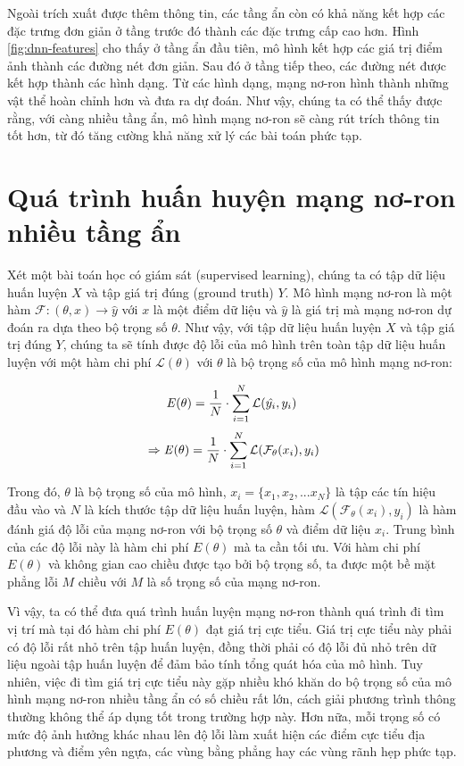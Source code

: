 Ngoài trích xuất được thêm thông tin, các tầng ẩn còn có khả năng kết hợp các đặc trưng đơn giản ở tầng trước đó thành các đặc trưng cấp cao hơn. Hình \ref{fig:dnn-features} cho thấy ở tầng ẩn đầu tiên, mô hình kết hợp các giá trị điểm ảnh thành các đường nét đơn giản. Sau đó ở tầng tiếp theo, các đường nét được kết hợp thành các hình dạng. Từ các hình dạng, mạng nơ-ron hình thành những vật thể hoàn chỉnh hơn và đưa ra dự đoán. Như vậy, chúng ta có thể thấy được rằng, với càng nhiều tầng ẩn, mô hình mạng nơ-ron sẽ càng rút trích thông tin tốt hơn, từ đó tăng cường khả năng xử lý các bài toán phức tạp.

\section{Quá trình huấn huyện mạng nơ-ron nhiều tầng ẩn}

Xét một bài toán học có giám sát (supervised learning), chúng ta có tập dữ liệu huấn luyện $X$ và tập giá trị đúng (ground truth) $Y$. Mô hình mạng nơ-ron là một hàm $\mathcal{F}: (\theta, x) \rightarrow \hat{y}$ với $x$ là một điểm dữ liệu và $\hat{y}$ là giá trị mà mạng nơ-ron dự đoán ra dựa theo bộ trọng số $\theta$. Như vậy, với tập dữ liệu huấn luyện $X$ và tập giá trị đúng $Y$, chúng ta sẽ tính được độ lỗi của mô hình trên toàn tập dữ liệu huấn luyện với một hàm chi phí $\mathcal{L}(\theta)$ với $\theta$ là bộ trọng số của mô hình mạng nơ-ron:

\begin{equation}
\label{eqn:E-y}
\mathbf{\it{E}(\theta)} = \frac{1}{N}\cdot \sum_{i=1}^{N}\mathcal{L}(\hat{y_i}, y_i)
\end{equation}
\begin{equation}
\label{eqn:E-Fx}
\\\Rightarrow \mathbf{\it{E}(\theta)} = \frac{1}{N}\cdot \sum_{i=1}^{N}\mathcal{L}(\mathcal{F}_\theta( x_i), y_i)
\end{equation}

Trong đó, $\theta$ là bộ trọng số của mô hình, $x_i = \{x_1, x_2,...x_N\}$ là tập các tín hiệu đầu vào và $N$ là kích thước tập dữ liệu huấn luyện, hàm $\mathcal{L}(\mathcal{F}_\theta( x_i), y_i)$ là hàm đánh giá độ lỗi của mạng nơ-ron với bộ trọng số $\theta$ và điểm dữ liệu $x_i$. Trung bình của các độ lỗi này là hàm chi phí $E(\theta)$ mà ta cần tối ưu. Với hàm chi phí $E(\theta)$ và không gian cao chiều được tạo bởi bộ trọng số, ta được một bề mặt phẳng lỗi $M$ chiều với $M$ là số trọng số của mạng nơ-ron.

Vì vậy, ta có thể đưa quá trình huấn luyện mạng nơ-ron thành quá trình đi tìm vị trí mà tại đó hàm chi phí $E(\theta)$ đạt giá trị cực tiểu. Giá trị cực tiểu này phải có độ lỗi rất nhỏ trên tập huấn luyện, đồng thời phải có độ lỗi đủ nhỏ trên dữ liệu ngoài tập huấn luyện để đảm bảo tính tổng quát hóa của mô hình. Tuy nhiên, việc đi tìm giá trị cực tiểu này gặp nhiều khó khăn do bộ trọng số của mô hình mạng nơ-ron nhiều tầng ẩn có số chiều rất lớn, cách giải phương trình thông thường không thể áp dụng tốt trong trường hợp này. Hơn nữa, mỗi trọng số có mức độ ảnh hưởng khác nhau lên độ lỗi làm xuất hiện các điểm cực tiểu địa phương và điểm yên ngựa, các vùng bằng phẳng hay các vùng rãnh hẹp phức tạp.

